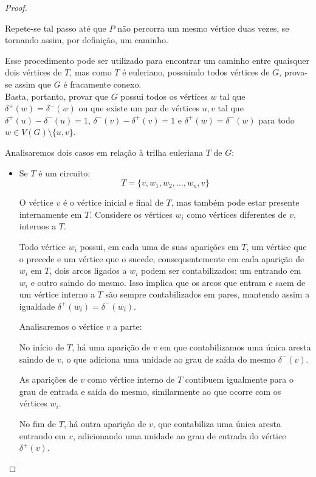 \documentclass[12pt, a4paper]{article}
\begin{document}
\begin{proof}
\begin{tcolorbox}
            Repete-se tal passo até que $P$ não percorra um mesmo vértice duas vezes, se tornando assim, por definição, um caminho.

        \end{tcolorbox}
    
    Esse procedimento pode ser utilizado para encontrar um caminho entre quaisquer dois vértices de $T$, mas como $T$ é euleriano, possuindo todos vértices de $G$, prova-se assim que $G$ é fracamente conexo. \\

     Basta, portanto, provar que $G$ possui todos os vértices $w$ tal que $\delta^+(w) = \delta^-(w)$ ou que existe um par de vértices $u, v$ tal que $\delta^+(u) - \delta^-(u) = 1$, $\delta^-(v) - \delta^+(v) = 1$ e $\delta^+(w) = \delta^-(w)$ para todo $w \in V(G)\setminus \{u, v\}$.

    Analisaremos dois casos em relação à trilha euleriana $T$ de $G$:

    \begin{itemize}
        \item Se $T$ é um circuito:
            \[
                T  = \{v, w_1, w_2, \dots, w_n, v\}
            \]

            O vértice $v$ é o vértice inicial e final de $T$, mas também pode estar presente internamente em $T$. 
            Considere os vértices $w_i$ como vértices diferentes de $v$, internos a $T$.

            Todo vértice $w_i$ possui, em cada uma de suas aparições em $T$, um vértice que o precede e um vértice que o sucede, consequentemente em cada aparição de $w_i$ em $T$, dois arcos ligados a $w_i$ podem ser contabilizados: um entrando em $w_i$ e outro saindo do mesmo. 
            Isso implica que os arcos que entram e saem de um vértice interno a $T$ são sempre contabilizados em pares, mantendo assim a igualdade $\delta^+(w_i) = \delta^-(w_i)$.

            Analisaremos o vértice $v$ a parte:

            No início de $T$, há uma aparição de $v$ em que contabilizamos uma única aresta saindo de $v$, o que adiciona uma unidade ao grau de saída do mesmo $\delta^-(v)$.

            As aparições de $v$ como vértice interno de $T$ contibuem igualmente para o grau de entrada e saída do mesmo, similarmente ao que ocorre com os vértices $w_i$.

            No fim de $T$, há outra aparição de $v$, que contabiliza uma única aresta entrando em $v$, adicionando uma unidade ao grau de entrada do vértice $\delta^+(v)$.


\end{itemize}
\end{proof}
\end{document}
